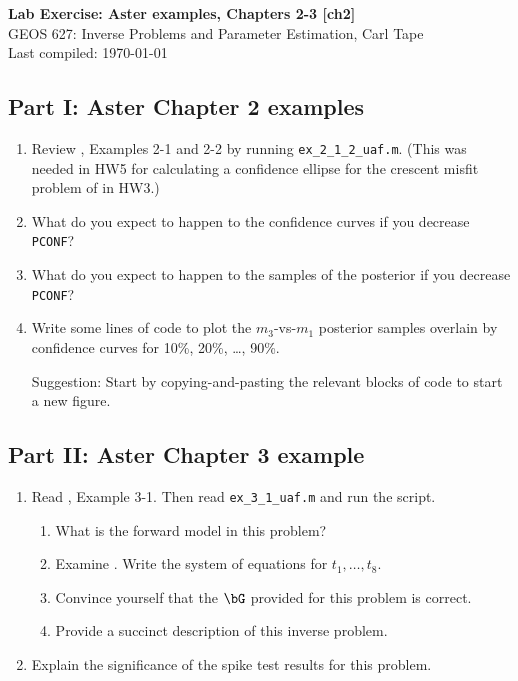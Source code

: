 \documentclass[11pt,titlepage,fleqn]{article}
\begin{document}

\begin{spacing}{1.2}
\centering
{\large \bf Lab Exercise: Aster examples, Chapters 2-3 [ch2]} \\
GEOS 627: Inverse Problems and Parameter Estimation, Carl Tape \\
Last compiled: \today \\
\end{spacing}

\subsection*{Part I: Aster Chapter 2 examples}

\begin{enumerate}
\item Review \citet{AsterE2}, Examples 2-1 and 2-2 by running \verb+ex_2_1_2_uaf.m+.
(This was needed in HW5 for calculating a confidence ellipse for the crescent misfit problem of \citet{Tarantola2005} in HW3.)

\item What do you expect to happen to the confidence curves if you decrease \verb+PCONF+?

\item What do you expect to happen to the samples of the posterior if you decrease \verb+PCONF+?

\item Write some lines of code to plot the $m_3$-vs-$m_1$ posterior samples overlain by confidence curves for 10\%, 20\%, \ldots, 90\%.

Suggestion: Start by copying-and-pasting the relevant blocks of code to start a new figure.

\end{enumerate}


\subsection*{Part II: Aster Chapter 3 example}

\begin{enumerate}
\item Read \citet{AsterE2}, Example 3-1. Then read \verb+ex_3_1_uaf.m+ and run the script. 
%
\begin{enumerate}
\item What is the forward model in this problem?
\item Examine . Write the system of equations for $t_1, \ldots, t_8$.
\item Convince yourself that the $\bG$ provided for this problem is correct.
\item Provide a succinct description of this inverse problem.
\end{enumerate}

\item Explain the significance of the spike test results for this problem.

\end{enumerate}
\end{document}
